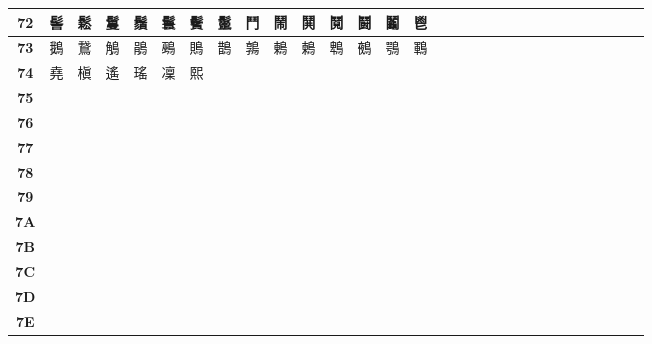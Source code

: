 \begin{table}[H]
\begin{tabular}{|Sc|Sc|Sc|Sc|Sc|Sc|Sc|Sc|Sc|Sc|Sc|Sc|Sc|Sc|Sc|}
\textbf{72} & 髻 & 鬆 & 鬘 & 鬚 & 鬟 & 鬢 & 鬣 & 鬥 & 鬧 & 鬨 & 鬩 & 鬪 & 鬮 & 鬯 \\ \hline
\textbf{73} & 鵝 & 鵞 & 鵤 & 鵑 & 鵐 & 鵙 & 鵲 & 鶉 & 鶇 & 鶫 & 鵯 & 鵺 & 鶚 & 鶤 \\ \hline
\textbf{74} & 堯 & 槇 & 遙 & 瑤 & 凜 & 熙 &  &  &  &  &  &  &  &  \\ \hline
\textbf{75} &  &  &  &  &  &  &  &  &  &  &  &  &  &  \\ \hline
\textbf{76} &  &  &  &  &  &  &  &  &  &  &  &  &  &  \\ \hline
\textbf{77} &  &  &  &  &  &  &  &  &  &  &  &  &  &  \\ \hline
\textbf{78} &  &  &  &  &  &  &  &  &  &  &  &  &  &  \\ \hline
\textbf{79} &  &  &  &  &  &  &  &  &  &  &  &  &  &  \\ \hline
\textbf{7A} &  &  &  &  &  &  &  &  &  &  &  &  &  &  \\ \hline
\textbf{7B} &  &  &  &  &  &  &  &  &  &  &  &  &  &  \\ \hline
\textbf{7C} &  &  &  &  &  &  &  &  &  &  &  &  &  &  \\ \hline
\textbf{7D} &  &  &  &  &  &  &  &  &  &  &  &  &  &  \\ \hline
\textbf{7E} &  &  &  &  &  &  &  &  &  &  &  &  &  &  \\ \hline
\end{tabular}
\end{table}

